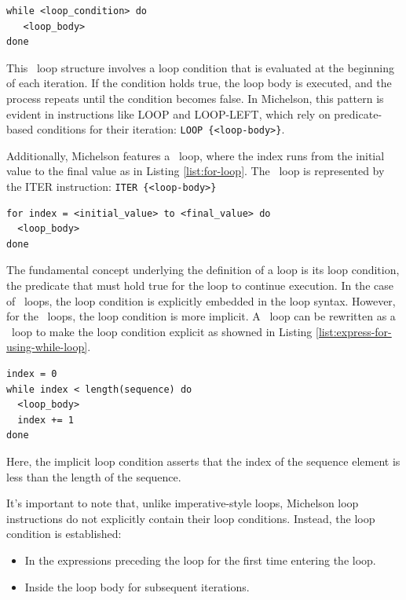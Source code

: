 \documentclass[a4paper,USenglish,cleveref, autoref, thm-restate]{lipics-v2021}
\begin{document}
\begin{lstlisting}[caption={While loop.},label=list:while-loop,captionpos=t,float,abovecaptionskip=-\medskipamount]
while <loop_condition> do
   <loop_body>
done
\end{lstlisting}
This \KWHILE\  loop structure involves a loop condition that is evaluated at the beginning of each iteration. If the condition holds true, the loop body is executed, and the process repeats until the condition becomes false.  In Michelson, this pattern is evident in instructions like LOOP and LOOP-LEFT, which rely on predicate-based conditions for their iteration: \lstinline/LOOP {<loop-body>}/.

Additionally, Michelson features a \KFOR\ loop, where the index runs from the initial value to the final value as in Listing \ref{list:for-loop}. The \KFOR\ loop is represented by the ITER instruction: \lstinline/ITER {<loop-body>}/

\begin{lstlisting}[caption={For loop.},label=list:for-loop,captionpos=t,float,abovecaptionskip=-\medskipamount]
for index = <initial_value> to <final_value> do
  <loop_body>
done
\end{lstlisting}

The fundamental concept underlying the definition of a loop is its loop condition, the predicate that must hold true for the loop to continue execution. In the case of \KWHILE\ loops, the  loop condition is explicitly embedded in the loop syntax. However, for the \KFOR\  loops, the loop condition is more implicit. A \KFOR\  loop can be rewritten as a  \KWHILE\ loop to make the  loop condition explicit as showned in Listing \ref{list:express-for-using-while-loop}.
\begin{lstlisting}[caption={Expressing a \KFOR\ loop using a \KWHILE\ loop.},label=list:express-for-using-while-loop,captionpos=t,float,abovecaptionskip=-\medskipamount]
index = 0
while index < length(sequence) do
  <loop_body>
  index += 1
done
\end{lstlisting}
Here, the implicit loop condition asserts that the index of the sequence element is less than the length of the sequence.

It's important  to note that, unlike imperative-style loops, Michelson loop instructions do not explicitly contain their loop conditions. Instead, the  loop condition is established:
\begin{itemize}
 \item In the expressions preceding the loop for the first time entering the loop.
 \item Inside the loop body for subsequent iterations.
\end{itemize}
\end{document}
